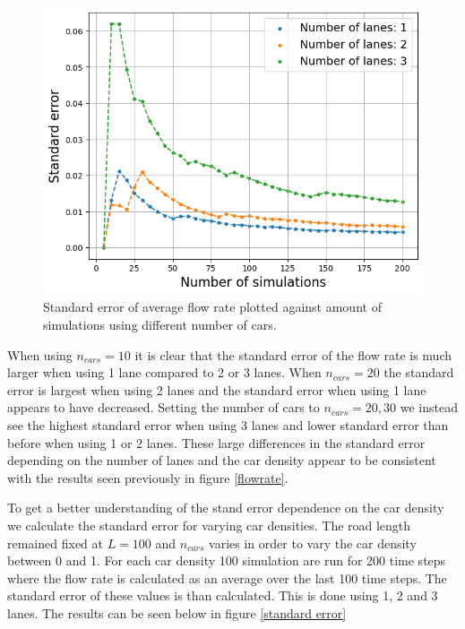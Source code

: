 \documentclass[a4paper,12pt]{article}
\begin{document}
\begin{figure}[H]
\begin{minipage}{.5\textwidth}
    \end{minipage}
    \centering
    \begin{minipage}{.5\textwidth}
        \centering
        \includegraphics[scale=0.47]{Images/standard error 50 cars 120.png}
    \end{minipage}%
    \caption{Standard error of average flow rate plotted against amount of simulations using different number of cars.}
    \label{standard error 1}
\end{figure}

When using $n_{cars}=10$ it is clear that the standard error of the flow rate is much larger when using 1 lane compared to 2 or 3 lanes.
When $n_{cars}=20$ the standard error is largest when using 2 lanes and the standard error when using 1 lane appears to have decreased.
Setting the number of cars to $n_{cars}=20, 30$ we instead see the highest standard error when using 3 lanes and lower standard error than before 
when using 1 or 2 lanes. These large differences in the standard error depending on the number of lanes and the car density appear to 
be consistent with the results seen previously in figure \ref*{flowrate}.

To get a better understanding of the stand error dependence on the car density we calculate the standard error for varying car densities.
The road length remained fixed at $L=100$ and $n_{cars}$ varies in order to vary the car density between 0 and 1. For each car density 100 simulation are run
for 200 time steps where the flow rate is calculated as an average over the last 100 time steps. The standard error of these values is than calculated.
This is done using 1, 2 and 3 lanes. The results can be seen below in figure \ref*{standard error}
\end{document}
